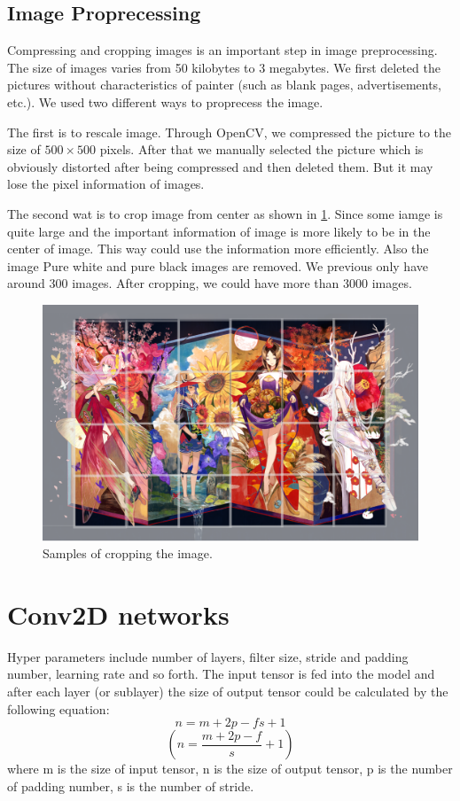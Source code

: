 \documentclass{article}
\begin{document}
\subsection{Image Proprecessing}
Compressing and cropping images is an important step in image preprocessing. 
The size of images varies from 50 kilobytes to 3 megabytes.  We first deleted the pictures without characteristics of painter (such as blank pages, advertisements, etc.). We used two different ways to proprecess the image.

The first is to rescale image. Through OpenCV, we compressed the picture to the size of $500 \times 500$ pixels. After that we manually selected the picture which is obviously distorted after being compressed and then deleted them. But it may lose the pixel information of images.

The second wat is to crop image from center as shown in \ref{crop_sample}. Since some iamge is quite large and the important information of image is more likely to be in the center of image. This way could use the information more efficiently. Also the image Pure white and pure black images are removed. We previous only have around 300 images. After cropping, we could have more than 3000 images. 

\begin{figure}[ht]
  \centering
  \includegraphics[width=0.5\linewidth]{crop_sample.png}
  \caption{Samples of cropping the image.}
  \label{crop_sample}
\end{figure}




\section{Conv2D networks}

Hyper parameters include number of layers, filter size, stride and padding number, learning rate and so forth. The input tensor is fed into the model and after each layer (or sublayer) the size of output tensor could be calculated by the following equation:
$$n=m+2p-fs+1$$
$$(n = \frac{m+2p-f}{s} + 1)$$
where m is the size of input tensor, n is the size of output tensor, p is the number of padding number, s is the number of stride.
\end{document}
